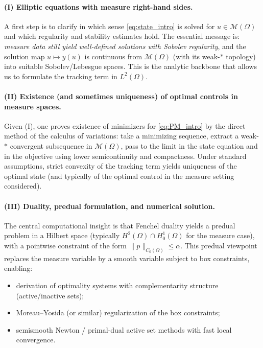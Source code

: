 \documentclass[11pt,a4paper]{article}
\begin{document}
\paragraph{(I) Elliptic equations with measure right-hand sides.}
A first step is to clarify in which sense \eqref{eq:state_intro} is solved for $u\in\mathcal{M}(\Omega)$ and which regularity and stability estimates hold.
The essential message is: \emph{measure data still yield well-defined solutions with Sobolev regularity}, and the solution map $u\mapsto y(u)$ is continuous from $\mathcal{M}(\Omega)$ (with its weak-$\ast$ topology) into suitable Sobolev/Lebesgue spaces.
This is the analytic backbone that allows us to formulate the tracking term in $L^2(\Omega)$.

\paragraph{(II) Existence (and sometimes uniqueness) of optimal controls in measure spaces.}
Given (I), one proves existence of minimizers for \eqref{eq:PM_intro} by the direct method of the calculus of variations:
take a minimizing sequence, extract a weak-$\ast$ convergent subsequence in $\mathcal{M}(\Omega)$, pass to the limit in the state equation and in the objective using lower semicontinuity and compactness.
Under standard assumptions, strict convexity of the tracking term yields uniqueness of the optimal state (and typically of the optimal control in the measure setting considered).

\paragraph{(III) Duality, predual formulation, and numerical solution.}
The central computational insight is that Fenchel duality yields a predual problem in a Hilbert space (typically $H^2(\Omega)\cap H^1_0(\Omega)$ for the measure case), with a pointwise constraint of the form $\|p\|_{C_0(\Omega)}\le \alpha$.
This predual viewpoint replaces the measure variable by a smooth variable subject to box constraints, enabling:
\begin{itemize}
  \item derivation of optimality systems with complementarity structure (active/inactive sets);
  \item Moreau--Yosida (or similar) regularization of the box constraints;
  \item semismooth Newton / primal-dual active set methods with fast local convergence.
\end{itemize}
\end{document}

